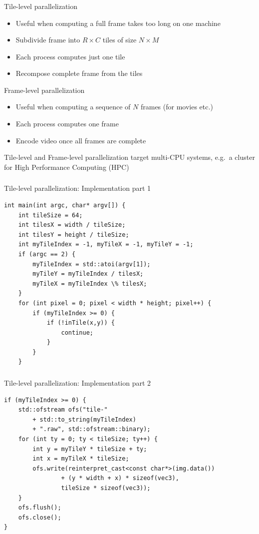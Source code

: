 \documentclass[utf8,stillsansserifmath,fleqn,t]{beamer}
\begin{document}
\begin{frame}[label=parallelization-tile]
\frametitle{\insertsection}
Tile-level parallelization
\begin{itemize}
\item Useful when computing a full frame takes too long on one machine
\item Subdivide frame into $R\times C$ tiles of size $N\times M$
\item Each process computes just one tile
\item Recompose complete frame from the tiles
\end{itemize}
Frame-level parallelization
\begin{itemize}
\item Useful when computing a sequence of $N$ frames (for movies etc.)
\item Each process computes one frame
\item Encode video once all frames are complete
\end{itemize}
Tile-level and Frame-level parallelization target multi-CPU systems,
e.g.~a cluster for High Performance Computing (HPC)
\end{frame}

\begin{frame}[fragile]
\frametitle{\insertsection}
Tile-level parallelization: Implementation part 1
\begin{lstlisting}
int main(int argc, char* argv[]) {
    int tileSize = 64;
    int tilesX = width / tileSize;
    int tilesY = height / tileSize;
    int myTileIndex = -1, myTileX = -1, myTileY = -1;
    if (argc == 2) {
        myTileIndex = std::atoi(argv[1]);
        myTileY = myTileIndex / tilesX;
        myTileX = myTileIndex \% tilesX;
    }
    for (int pixel = 0; pixel < width * height; pixel++) {
        if (myTileIndex >= 0) {
            if (!inTile(x,y)) {
                continue;
            }
        }
    }
\end{lstlisting}
\end{frame}

\begin{frame}[fragile]
\frametitle{\insertsection}
Tile-level parallelization: Implementation part 2
\begin{lstlisting}
if (myTileIndex >= 0) {
    std::ofstream ofs("tile-"
        + std::to_string(myTileIndex)
        + ".raw", std::ofstream::binary);
    for (int ty = 0; ty < tileSize; ty++) {
        int y = myTileY * tileSize + ty;
        int x = myTileX * tileSize;
        ofs.write(reinterpret_cast<const char*>(img.data())
                + (y * width + x) * sizeof(vec3),
                tileSize * sizeof(vec3));
    }
    ofs.flush();
    ofs.close();
}
\end{lstlisting}
\end{frame}
\end{document}
